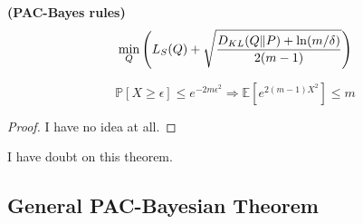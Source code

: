 \textbf{(PAC-Bayes rules)}
\[
    \min_{Q} \left( L_S(Q) + \sqrt{\frac{D_{KL}(Q \Arrowvert P) + \ln(m/\delta)}{2(m-1)} } \right)
\]

\begin{lemma}
    \[
        \mathbb{P}\left[ X \ge \epsilon \right] \le e^{-2m \epsilon^2} \Rightarrow
        \mathbb{E}\left[ e^{2(m-1) X^2} \right] \le m
    \]
    \begin{proof}
        I have no idea at all.
    \end{proof}
\end{lemma}

I have doubt on this theorem.

\subsection{General PAC-Bayesian Theorem}%


